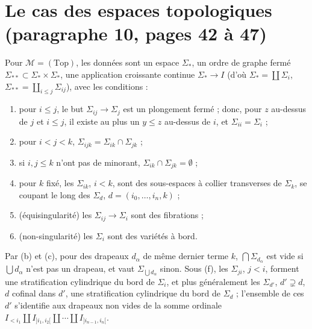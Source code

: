 \documentclass[11pt,a4paper]{article}
\begin{document}
\section*{Le cas des espaces topologiques (paragraphe 10, pages 42 à 47)}

Pour $\mathcal{M} = (\mathrm{Top})$, les données sont un espace $\Sigma_*$, un ordre
de graphe fermé $\Sigma_{**} \subset \Sigma_* \times \Sigma_*$, une application
croissante continue $\Sigma_* \to I$ (d'où $\Sigma_* = \coprod \Sigma_i$, $\Sigma_{**}
= \coprod_{i \leq j} \Sigma_{ij}$), avec les conditions :
\begin{enumerate}
\item[(a)] pour $i \leq j$, le but $\Sigma_{ij} \to \Sigma_j$ est un plongement
fermé ; donc, pour $z$ au-dessus de $j$ et $i \leq j$, il existe au plus un $y \leq z$
au-dessus de $i$, et $\Sigma_{ii} = \Sigma_i$ ;
\item[(b)] pour $i<j<k$, $\Sigma_{ijk} = \Sigma_{ik} \cap \Sigma_{jk}$ ;
\item[(c)] si $i, j \leq k$ n'ont pas de minorant, $\Sigma_{ik} \cap \Sigma_{jk} =
\emptyset$ ;
\item[(d)] pour $k$ fixé, les $\Sigma_{ik}$, $i<k$, sont des sous-espaces à collier
transverses de $\Sigma_k$, se coupant le long des $\Sigma_d$, $d = (i_0, …, i_n,
k)$ ;
\item[(e)] (équisingularité) les $\Sigma_{ij} \to \Sigma_i$ sont des fibrations ;
\item[(f)] (non-singularité) les $\Sigma_i$ sont des variétés à bord.
\end{enumerate}
Par (b) et (c), pour des drapeaux $d_\alpha$ de même dernier terme $k$,
$\bigcap \Sigma_{d_\alpha}$ est vide si $\bigcup d_\alpha$ n'est pas un drapeau, et
vaut $\Sigma_{\bigcup d_\alpha}$ sinon. Sous (f), les $\Sigma_{ji}$, $j<i$, forment
une stratification cylindrique du bord de $\Sigma_i$, et plus généralement les
$\Sigma_{d'}$, $d' \supsetneq d$, $d$ cofinal dans $d'$, une stratification
cylindrique du bord de $\Sigma_d$ ; l'ensemble de ces $d'$ s'identifie aux drapeaux
non vides de la somme ordinale $I_{<i_1} \amalg I_{]i_1, i_2[} \amalg \cdots
\amalg I_{]i_{n-1}, i_n[}$.
\end{document}
